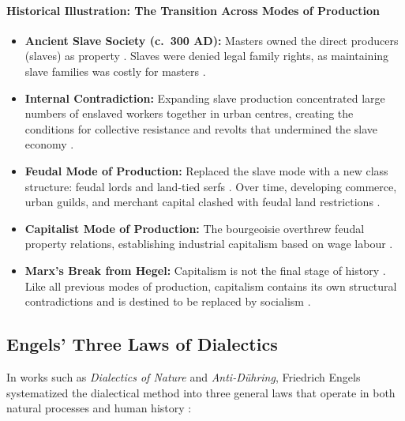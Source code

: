 \paragraph{Historical Illustration: The Transition Across Modes of Production}
\begin{itemize}
    \item \textbf{Ancient Slave Society (c.\ 300 AD):} Masters owned the direct producers (slaves) as property . Slaves were denied legal family rights, as maintaining slave families was costly for masters .
    \item \textbf{Internal Contradiction:} Expanding slave production concentrated large numbers of enslaved workers together in urban centres, creating the conditions for collective resistance and revolts that undermined the slave economy .
    \item \textbf{Feudal Mode of Production:} Replaced the slave mode with a new class structure: feudal lords and land-tied serfs . Over time, developing commerce, urban guilds, and merchant capital clashed with feudal land restrictions .
    \item \textbf{Capitalist Mode of Production:} The bourgeoisie overthrew feudal property relations, establishing industrial capitalism based on wage labour .
    \item \textbf{Marx's Break from Hegel:} Capitalism is not the final stage of history . Like all previous modes of production, capitalism contains its own structural contradictions and is destined to be replaced by socialism .
\end{itemize}

\subsection{Engels' Three Laws of Dialectics}

In works such as \textit{Dialectics of Nature} and \textit{Anti-Dühring}, Friedrich Engels systematized the dialectical method into three general laws that operate in both natural processes and human history :

